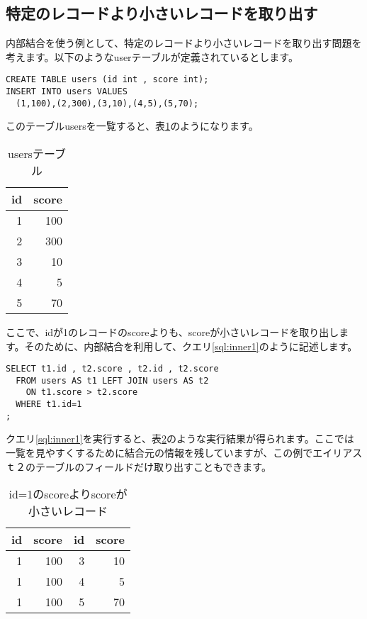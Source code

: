 \subsection{特定のレコードより小さいレコードを取り出す}

内部結合を使う例として、特定のレコードより小さいレコードを取り出す問題を考えます。以下のようなuserテーブルが定義されているとします。

\begin{lstlisting}[caption=usersテーブル定義,label=sql:createusers]
CREATE TABLE users (id int , score int);
INSERT INTO users VALUES
  (1,100),(2,300),(3,10),(4,5),(5,70);
\end{lstlisting}

このテーブルusersを一覧すると、表\ref{table:users}のようになります。

\begin{table}[htbp]
  \begin{tabular}{|r|r|} \hline
    id & score \\ \hline \hline  
    1 & 100 \\
    2 & 300 \\
    3 & 10 \\
    4 & 5 \\
    5 & 70 \\ \hline
  \end{tabular}
  \caption{usersテーブル}
  \label{table:users}
\end{table}


ここで、idが1のレコードのscoreよりも、scoreが小さいレコードを取り出します。そのために、内部結合を利用して、クエリ\ref{sql:inner1}のように記述します。

\begin{lstlisting}[caption=特定のレコードのscoreよりもscoreがが小さいレコードw探す,label=sql:inner1]
SELECT t1.id , t2.score , t2.id , t2.score
  FROM users AS t1 LEFT JOIN users AS t2
    ON t1.score > t2.score
  WHERE t1.id=1
;
\end{lstlisting}

クエリ\ref{sql:inner1}を実行すると、表\ref{table:usersres}のような実行結果が得られます。ここでは一覧を見やすくするために結合元の情報を残していますが、この例でエイリアスｔ２のテーブルのフィールドだけ取り出すこともできます。


\begin{table}[htbp]
  \begin{tabular}{|r|r|r|r|} \hline
    id & score & id & score \\ \hline \hline  
    1 & 100 & 3 & 10 \\
    1 & 100 & 4 & 5 \\
    1 & 100 & 5 & 70 \\ \hline
  \end{tabular}
  \caption{id=1のscoreよりscoreが小さいレコード}
  \label{table:usersres}
\end{table}

